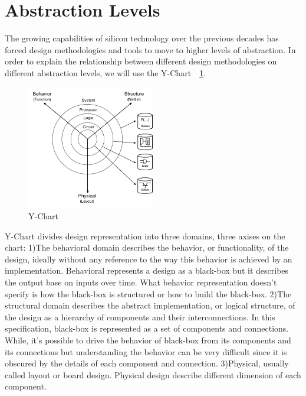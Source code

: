

%


\section{Abstraction Levels}

The growing capabilities of silicon technology over the previous decades has forced design methodologies and tools to move to higher levels of abstraction.
In order to explain the relationship between different design methodologies on different abstraction levels, we will use the Y-Chart~\cite{walker_1985_y_model}~\ref{fig:y-chart}.

\begin{figure}[h]
    \centering
    \includegraphics[width=0.5\textwidth]{figures/Introduction/Y-Chart.pdf}
    \caption{Y-Chart}
    \label{fig:y-chart}
\end{figure}

Y-Chart divides design representation into three domains, three axises on the chart:
1)The behavioral domain describes the behavior, or functionality, of the design, ideally without any reference to the way this behavior is achieved by an implementation.
Behavioral represents a design as a black-box but it describes the output base on inputs over time.
What behavior representation doesn't specify is how the black-box is structured or how to build the black-box.
2)The structural domain describes the abstract implementation, or logical structure, of the design as a hierarchy of components and their interconnections.
In this specification, black-box is represented as a set of components and connections.
While, it's possible to drive the behavior of black-box from its components and its connections but understanding the behavior can be very difficult since it is obscured by the details of each component and connection.
3)Physical, usually called layout or board design.
Physical design describe different dimension of each component.

